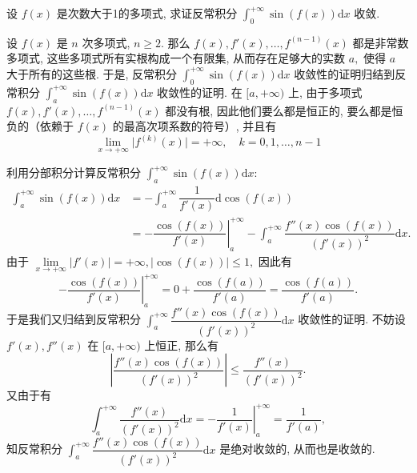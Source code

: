 \begin{question}[points = 10]
设 $f(x)$ 是次数大于1的多项式, 求证反常积分 $\int_{0}^{+\infty} \sin(f(x)) \mathrm{d}x$ 收敛.

\end{question}

\begin{solution}
设 $f(x)$ 是 $n$ 次多项式, $n \geqslant 2.$ 那么 $f(x), f'(x), \dots, f^{(n-1)}(x)$ 都是非常数多项式, 这些多项式所有实根构成一个有限集, 从而存在足够大的实数 $a,$ 使得 $a$ 大于所有的这些根. 于是, 反常积分 $\int_{0}^{+\infty} \sin(f(x)) \mathrm{d}x$ 收敛性的证明归结到反常积分 $\int_{a}^{+\infty} \sin(f(x)) \mathrm{d}x$ 收敛性的证明. 在 $[a, +\infty)$ 上, 由于多项式 $f(x), f'(x), \dots, f^{(n-1)}(x)$ 都没有根, 因此他们要么都是恒正的, 要么都是恒负的（依赖于 $f(x)$ 的最高次项系数的符号）, 并且有
\[\lim\limits_{x \to +\infty} \lvert f^{(k)}(x) \rvert = +\infty, \quad k = 0, 1, \dots, n-1\]

利用分部积分计算反常积分 $\int_{a}^{+\infty} \sin(f(x)) \mathrm{d}x:$
\begin{align*}
\int_{a}^{+\infty} \sin(f(x)) \mathrm{d}x & = -\int_{a}^{+\infty} \dfrac{1}{f'(x)} \mathrm{d} \cos(f(x)) \\
& = - \left. \dfrac{\cos(f(x))}{f'(x)} \right|_{a}^{+\infty} - \int_{a}^{+\infty} \dfrac{f''(x) \cos(f(x))}{\left(f'(x)\right)^2} \mathrm{d}x.
\end{align*}
由于 $\lim\limits_{x \to +\infty} \lvert f'(x) \rvert = +\infty, \lvert \cos(f(x)) \rvert \leqslant 1,$ 因此有
\[- \left. \dfrac{\cos(f(x))}{f'(x)} \right|_{a}^{+\infty} = 0 + \dfrac{\cos(f(a))}{f'(a)} = \dfrac{\cos(f(a))}{f'(a)}.\]
于是我们又归结到反常积分 $\int_{a}^{+\infty} \dfrac{f''(x) \cos(f(x))}{\left(f'(x)\right)^2} \mathrm{d}x$ 收敛性的证明. 不妨设 $f'(x), f''(x)$ 在 $[a, +\infty)$ 上恒正, 那么有
\[\left\lvert \dfrac{f''(x) \cos(f(x))}{\left(f'(x)\right)^2} \right\rvert \leqslant \dfrac{f''(x)}{\left(f'(x)\right)^2}.\]
又由于有
\[\int_{a}^{+\infty} \dfrac{f''(x)}{\left(f'(x)\right)^2} \mathrm{d}x = - \left. \dfrac{1}{f'(x)} \right|_{a}^{+\infty} = \dfrac{1}{f'(a)}, \]
知反常积分 $\int_{a}^{+\infty} \dfrac{f''(x) \cos(f(x))}{\left(f'(x)\right)^2} \mathrm{d}x$ 是绝对收敛的, 从而也是收敛的.
\end{solution}

